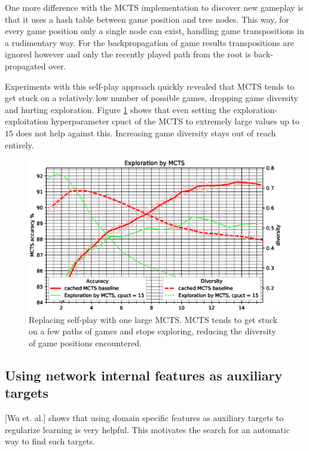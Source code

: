 \documentclass[12pt,onecolumn,oneside,titlepage]{article}
\begin{document}
One more difference with the MCTS implementation to discover new gameplay is that it uses a hash table between game position and tree nodes. This way, for every game position only a single node can exist, handling game transpositions in a rudimentary way. For 
the backpropagation of game results transpositions are ignored however and only the recently played path from the root is back-propagated over.

Experiments with this self-play approach quickly revealed that MCTS tends to get stuck on a relatively low number of possible games, dropping game diversity and hurting exploration. 
Figure \ref{fig:mcts_tree_explore} shows that even setting the exploration-exploitation hyperparameter cpuct of the MCTS to extremely large values up to $15$ does not help against this.
Increasing game diversity stays out of reach entirely.

\begin{figure}[H]
\centering
\includegraphics[clip,width=\columnwidth]{mcts_tree_explore}
\caption{Replacing self-play with one large MCTS. MCTS tends to get stuck on a few paths of games and stops exploring, reducing the diversity of game positions encountered.}
\label{fig:mcts_tree_explore}
\end{figure}


\subsection{Using network internal features as auxiliary targets}

\cite{wu2019accelerating}[Wu et. al.] shows that using domain specific features as auxiliary targets to regularize learning is very helpful. This motivates the search for an automatic way to find such targets.
\end{document}
